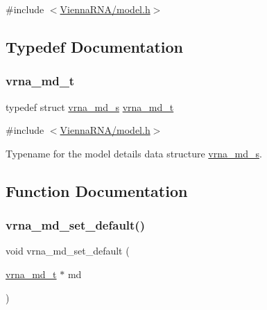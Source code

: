 {\ttfamily \#include $<$\mbox{\hyperlink{model_8h}{Vienna\+R\+N\+A/model.\+h}}$>$}



\subsection{Typedef Documentation}
\mbox{\label{group__model__details_ga1f8a10e12a0a1915f2a4eff0b28ea17c}} 
\subsubsection{\texorpdfstring{vrna\+\_\+md\+\_\+t}{vrna\_md\_t}}
{\footnotesize\ttfamily typedef struct \mbox{\hyperlink{group__model__details_structvrna__md__s}{vrna\+\_\+md\+\_\+s}} \mbox{\hyperlink{group__model__details_ga1f8a10e12a0a1915f2a4eff0b28ea17c}{vrna\+\_\+md\+\_\+t}}}



{\ttfamily \#include $<$\mbox{\hyperlink{model_8h}{Vienna\+R\+N\+A/model.\+h}}$>$}



Typename for the model details data structure \mbox{\hyperlink{group__model__details_structvrna__md__s}{vrna\+\_\+md\+\_\+s}}. 



\subsection{Function Documentation}
\mbox{\label{group__model__details_ga8ac6ff84936282436f822644bf841f66}} 
\subsubsection{\texorpdfstring{vrna\+\_\+md\+\_\+set\+\_\+default()}{vrna\_md\_set\_default()}}
{\footnotesize\ttfamily void vrna\+\_\+md\+\_\+set\+\_\+default (\begin{DoxyParamCaption}\item[{\mbox{\hyperlink{group__model__details_ga1f8a10e12a0a1915f2a4eff0b28ea17c}{vrna\+\_\+md\+\_\+t}} $\ast$}]{md }\end{DoxyParamCaption})}



